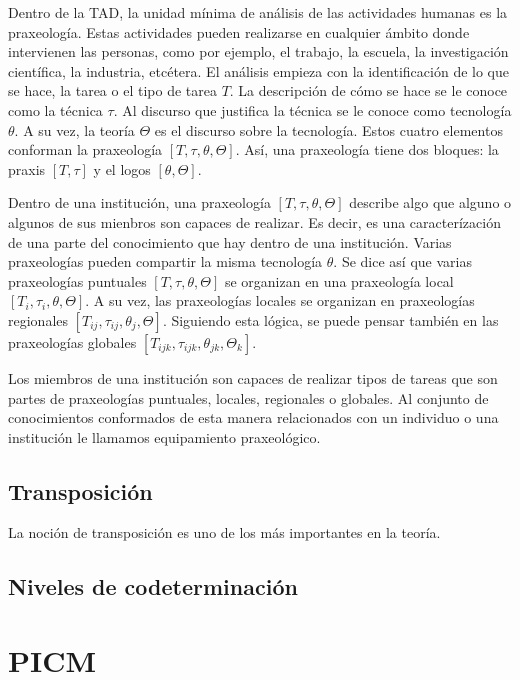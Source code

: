 \documentclass[12pt,spanish,]{book}
\begin{document}
Dentro de la TAD, la unidad mínima de análisis de las actividades humanas es la praxeología.
Estas actividades pueden realizarse en cualquier ámbito donde intervienen las personas, como por ejemplo, el trabajo, la escuela, la investigación científica, la industria, etcétera.
El análisis empieza con la identificación de lo que se hace, la tarea o el tipo de tarea \(T\).
La descripción de cómo se hace se le conoce como la técnica \(\tau\).
Al discurso que justifica la técnica se le conoce como tecnología \(\theta\).
A su vez, la teoría \(\Theta\) es el discurso sobre la tecnología.
Estos cuatro elementos conforman la praxeología \([T,\tau,\theta,\Theta]\).
Así, una praxeología tiene dos bloques: la praxis \([T,\tau]\) y el logos \([\theta,\Theta]\).

Dentro de una institución, una praxeología \([T,\tau,\theta,\Theta]\) describe algo que alguno o algunos de sus mienbros son capaces de realizar.
Es decir, es una caracterízación de una parte del conocimiento que hay dentro de una institución. Varias praxeologías pueden compartir la misma tecnología \(\theta\).
Se dice así que varias praxeologías puntuales \([T,\tau,\theta,\Theta]\) se organizan en una praxeología local \([T_i,\tau_i,\theta,\Theta]\).
A su vez, las praxeologías locales se organizan en praxeologías regionales \([T_{ij},\tau_{ij},\theta_j,\Theta]\).
Siguiendo esta lógica, se puede pensar también en las praxeologías globales \([T_{ijk},\tau_{ijk},\theta_{jk},\Theta_k]\).

Los miembros de una institución son capaces de realizar tipos de tareas que son partes de praxeologías puntuales, locales, regionales o globales. Al conjunto de conocimientos conformados de esta manera relacionados con un individuo o una institución le llamamos equipamiento praxeológico.

\hypertarget{transposiciuxf3n}{%
\subsection{Transposición}\label{transposiciuxf3n}}

La noción de transposición es uno de los más importantes en la teoría.

\hypertarget{niveles-de-codeterminaciuxf3n}{%
\subsection{Niveles de codeterminación}\label{niveles-de-codeterminaciuxf3n}}

\hypertarget{picm}{%
\section{PICM}\label{picm}}
\end{document}
